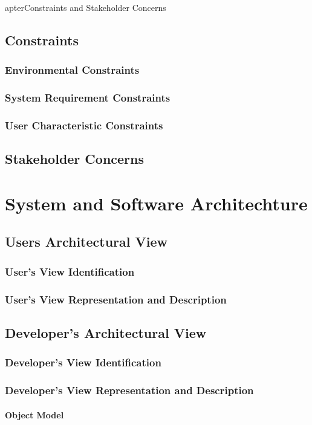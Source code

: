 apter{Constraints and Stakeholder Concerns}
	\section{Constraints}
		\subsection{Environmental Constraints}
		\subsection{System Requirement Constraints}
		\subsection{User Characteristic Constraints}
	\section{Stakeholder Concerns}
\chapter{System and Software Architechture}
	\section{Users Architectural View}
		\subsection{User's View Identification}
		\subsection{User's View Representation and Description}
	\section{Developer's Architectural View}
		 \subsection{Developer's View Identification}
		 \subsection{Developer's View Representation and Description}
			\subsubsection{Object Model}
